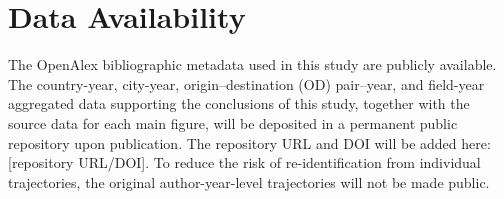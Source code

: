 \section*{Data Availability}

The OpenAlex bibliographic metadata used in this study are publicly available. The country-year, city-year, origin--destination (OD) pair--year, and field-year aggregated data supporting the conclusions of this study, together with the source data for each main figure, will be deposited in a permanent public repository upon publication. The repository URL and DOI will be added here: [repository URL/DOI]. To reduce the risk of re-identification from individual trajectories, the original author-year-level trajectories will not be made public.

